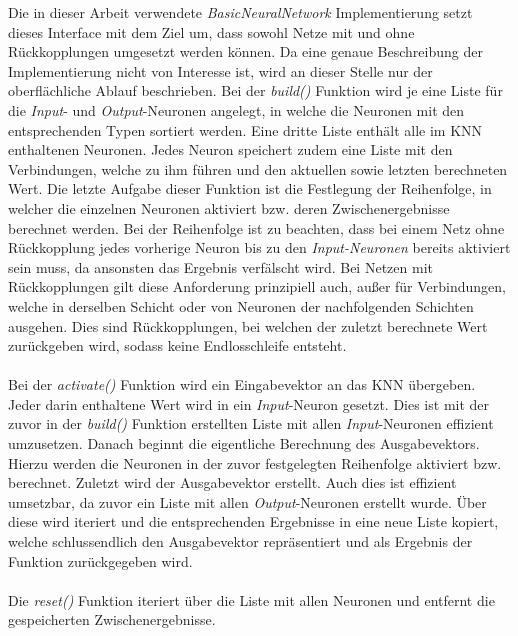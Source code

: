Die in dieser Arbeit verwendete \emph{BasicNeuralNetwork} Implementierung setzt dieses Interface mit dem Ziel um, dass sowohl Netze mit und ohne Rückkopplungen umgesetzt werden können. Da eine genaue Beschreibung der Implementierung nicht von Interesse ist, wird an dieser Stelle nur der oberflächliche Ablauf beschrieben. Bei der \emph{build()} Funktion wird je eine Liste für die \emph{Input}- und \emph{Output}-Neuronen angelegt, in welche die Neuronen mit den entsprechenden Typen sortiert werden. Eine dritte Liste enthält alle im \ac{KNN} enthaltenen Neuronen. Jedes Neuron speichert zudem eine Liste mit den Verbindungen, welche zu ihm führen und den aktuellen sowie letzten berechneten Wert. Die letzte Aufgabe dieser Funktion ist die Festlegung der Reihenfolge, in welcher die einzelnen Neuronen aktiviert bzw. deren Zwischenergebnisse berechnet werden. Bei der Reihenfolge ist zu beachten, dass bei einem Netz ohne Rückkopplung jedes vorherige Neuron bis zu den \emph{Input-Neuronen} bereits aktiviert sein muss, da ansonsten das Ergebnis verfälscht wird. Bei Netzen mit Rückkopplungen gilt diese Anforderung prinzipiell auch, außer für Verbindungen, welche in derselben Schicht oder von Neuronen der nachfolgenden Schichten ausgehen. Dies sind Rückkopplungen, bei welchen der zuletzt berechnete Wert zurückgeben wird, sodass keine Endlosschleife entsteht. 
\\\\
Bei der \emph{activate()} Funktion wird ein Eingabevektor an das \ac{KNN} übergeben. Jeder darin enthaltene Wert wird in ein \emph{Input}-Neuron gesetzt. Dies ist mit der zuvor in der \emph{build()} Funktion erstellten Liste mit allen \emph{Input}-Neuronen effizient umzusetzen. Danach beginnt die eigentliche Berechnung des Ausgabevektors. Hierzu werden die Neuronen in der zuvor festgelegten Reihenfolge aktiviert bzw. berechnet. Zuletzt wird der Ausgabevektor erstellt. Auch dies ist effizient umsetzbar, da zuvor ein Liste mit allen \emph{Output}-Neuronen erstellt wurde. Über diese wird iteriert und die entsprechenden Ergebnisse in eine neue Liste kopiert, welche schlussendlich den Ausgabevektor repräsentiert und als Ergebnis der Funktion zurückgegeben wird. 
\\\\
Die \emph{reset()} Funktion iteriert über die Liste mit allen Neuronen und entfernt die gespeicherten Zwischenergebnisse. 

